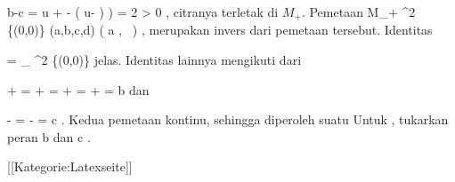 \mavergleichskettedisp
{\vergleichskette
{b-c
}
{ =} { u +  - \left(  u- )  \right)
}
{ =} { 2 
}
{ >} { 0
}
{ } {
}
}
{}{}{},
citranya terletak di $M_+$. Pemetaan
\maabbeledisp {\varphi} {M_+} { \R^2 \setminus \{(0,0)\}
} {(a,b,c,d)} { \left(  a  , \,   {  }                   \right)
} {,}
merupakan invers dari pemetaan tersebut. Identitas

\mavergleichskettedisp
{\vergleichskette
{ \varphi \circ \psi
}
{ =} {
_{ \R^2 \setminus \{(0,0)\}  }
}
{ } {
}
{ } {
}
{ } {
}
}
{}{}{}
jelas. Identitas lainnya mengikuti dari

\mavergleichskettealign
{\vergleichskettealign
{ {  } + 
}
{ =} { {  } + {  }  
}
{ =} { {  } + {  }  
}
{ =} { {  } + {  }
}
{ =} {b
}
}
{}
{}{}
dan

\mavergleichskettedisp
{\vergleichskette
{ {  } - 
}
{ =} { {  } - {  }
}
{ =} { c
}
{ } {}
{ } {}
}
{}{}{.}
Kedua pemetaan kontinu, sehingga diperoleh suatu
Untuk
, tukarkan peran
\mathkor {} {b} {dan} {c} {.}

 [[Kategorie:Latexseite]]
